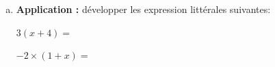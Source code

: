 \documentclass[../main.tex]{subfiles}
\begin{document}
\begin{enumerate}[a), font=\bfseries]
\begin{simplebox}
            \vspace{.3cm}
        \end{simplebox}
        \item \textbf{Application :} développer les expression littérales suivantes:
        \begin{center}
            \begin{minipage}{.45\linewidth}
                $3(x+4)=$
            \end{minipage}\hspace{.05\linewidth}
            \begin{minipage}{.45\linewidth}
                $-2\times(1+x)=$
            \end{minipage}
        \end{center}
    \end{enumerate}
\end{document}
